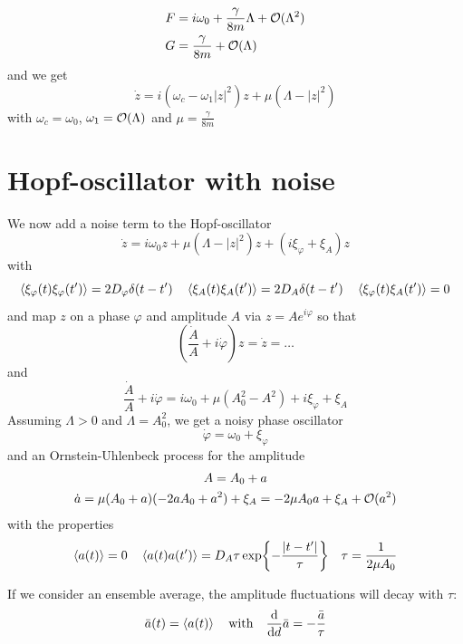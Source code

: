 \documentclass{notebook}
\begin{document}
%
\begin{align*}
	F &= i \omega_0 + \frac{\gamma}{8m} \Lambda + \mathcal{O}(\Lambda^2) \\
	G &= \frac{\gamma}{8m} + \mathcal{O}(\Lambda)
\end{align*}
%
and we get
%
\begin{equation}
\dot{z} = i (\omega_c - \omega_1 |z|^2)z + \mu(\Lambda - |z|^2)
\end{equation}
%
with $\omega_c = \omega_0$, $\omega_1 = \mathcal{O}(\Lambda)$ and $\mu = \frac{\gamma}{8m}$

\section{Hopf-oscillator with noise}

We now add a noise term to the Hopf-oscillator
%
\begin{equation}
\dot{z} = i \omega_0 z + \mu(\Lambda - |z|^2)z + (i \xi_{\varphi} + \xi_A) z
\end{equation}
%
with 
%
\begin{equation*}
	\expval{\xi_{\varphi}(t)\xi_{\varphi}(t')} = 2 D_{\varphi} \delta(t-t') \quad \expval{\xi_A(t)\xi_A(t')} = 2 D_A \delta(t-t') \quad
	\expval{\xi_{\varphi}(t)\xi_A(t')} = 0
\end{equation*}
%
and map $z$ on a phase $\varphi$ and amplitude $A$ via $z = A e^{i \varphi}$ so that
%
\begin{equation}
\left( \frac{\dot{A}}{A} + i \dot{\varphi} \right) z = \dot{z} = \dots
\end{equation}
%
and
%
\begin{equation}
\frac{\dot{A}}{A} + i \dot{\varphi} = i \omega_0 + \mu(A_0^2- A^2) + i \xi_{\varphi} + \xi_A
\end{equation}
%
Assuming $\Lambda > 0$ and $\Lambda = A_0^2$, we get a noisy phase oscillator
%
\begin{equation}
\dot{\varphi} = \omega_0 + \xi_{\varphi}
\end{equation}
%
and an Ornstein-Uhlenbeck process for the amplitude
%
%
\begin{equation}
%
\begin{gathered}
A = A_0 + a \\
\dot{a} = \mu(A_0 + a)(-2 a A_0 + a^2) + \xi_A = -2\mu A_0 a + \xi_A + \O{a^2}
\end{gathered}
%
\end{equation}
%
with the properties
%
\begin{equation*}
	\expval{a(t)} = 0 \quad \expval{a(t)a(t')} = D_A \tau \exp{- \frac{|t-t'|}{\tau}} \quad \tau = \frac{1}{2 \mu A_0}
\end{equation*}
%
\begin{remark}[Remark]
	If we consider an ensemble average, the amplitude fluctuations will decay with $\tau$: 
	\begin{equation*}
		\bar{a}(t) = \expval{a(t)} \quad \mathrm{with} \quad \dv{d} \bar{a} = - \frac{\bar{a}}{\tau}
	\end{equation*}
\end{remark}
\end{document}
